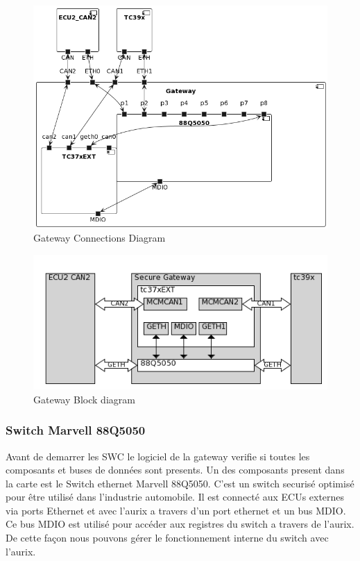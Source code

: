 \begin{figure}[!htb]
 \centering
 \includegraphics[width=\textwidth]{img/GWConnectionsDiagram.png}
 \caption{Gateway Connections Diagram}
 \label{fig:connections-diagram}
\end{figure}

\begin{figure}[!htb]
 \centering
 \includegraphics[width=\textwidth]{img/gateway_block_diagram.png}
 \caption{Gateway Block diagram}
 \label{fig:block diagram}
\end{figure}

\subsubsection{Switch Marvell 88Q5050}

Avant de demarrer les SWC le logiciel de la gateway verifie si toutes les composants et buses de donn\'ees sont presents. Un des composants present dans la carte est le Switch ethernet Marvell 88Q5050\cite{sw88Q5050}. C'est un switch securis\'e optimis\'e pour \^etre utilis\'e dans l'industrie automobile. Il est connect\'e aux ECUs externes via ports Ethernet et avec l'aurix a travers d'un port ethernet et un bus MDIO\cite{mdio-background}. Ce bus MDIO est utilis\'e pour accéder aux registres du switch a travers de l'aurix. De cette façon nous pouvons gérer le fonctionnement interne du switch avec l'aurix.

